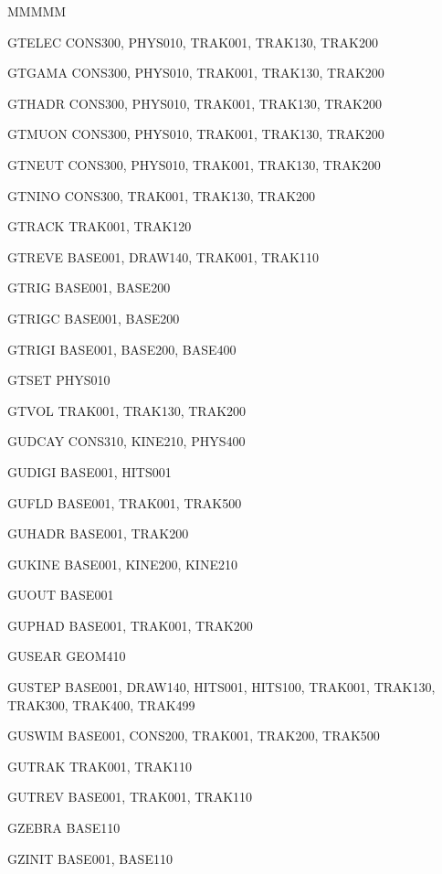 {\begin{DL}{MMMMM}
\item[GTELEC]CONS300, PHYS010, TRAK001, TRAK130, TRAK200
\item[GTGAMA]CONS300, PHYS010, TRAK001, TRAK130, TRAK200
\item[GTHADR]CONS300, PHYS010, TRAK001, TRAK130, TRAK200
\item[GTMUON]CONS300, PHYS010, TRAK001, TRAK130, TRAK200
\item[GTNEUT]CONS300, PHYS010, TRAK001, TRAK130, TRAK200
\item[GTNINO]CONS300, TRAK001, TRAK130, TRAK200
\item[GTRACK]TRAK001, TRAK120
\item[GTREVE]BASE001, DRAW140, TRAK001, TRAK110
\item[GTRIG ]BASE001, BASE200
\item[GTRIGC]BASE001, BASE200
\item[GTRIGI]BASE001, BASE200, BASE400
\item[GTSET ]PHYS010
\item[GTVOL ]TRAK001, TRAK130, TRAK200
\item[GUDCAY]CONS310, KINE210, PHYS400
\item[GUDIGI]BASE001, HITS001
\item[GUFLD ]BASE001, TRAK001, TRAK500
\item[GUHADR]BASE001, TRAK200
\item[GUKINE]BASE001, KINE200, KINE210
\item[GUOUT ]BASE001
\item[GUPHAD]BASE001, TRAK001, TRAK200
\item[GUSEAR]GEOM410
\item[GUSTEP]BASE001, DRAW140, HITS001, HITS100, TRAK001, TRAK130,\\
TRAK300, TRAK400, TRAK499
\item[GUSWIM]BASE001, CONS200, TRAK001, TRAK200, TRAK500
\item[GUTRAK]TRAK001, TRAK110
\item[GUTREV]BASE001, TRAK001, TRAK110
\item[GZEBRA]BASE110
\item[GZINIT]BASE001, BASE110
\end{DL}}
 
 
